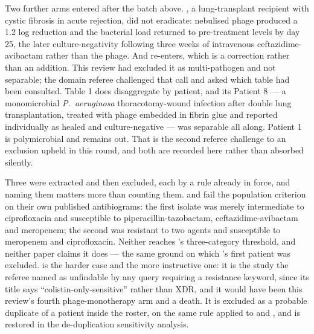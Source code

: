 Two further arms entered after the batch above. \textcite{PardoFreire2025_asmcr}, a lung-transplant recipient with cystic fibrosis in acute rejection, did not eradicate: nebulised phage produced a 1.2 log reduction and the bacterial load returned to pre-treatment levels by day 25, the later culture-negativity following three weeks of intravenous ceftazidime-avibactam rather than the phage. And \textcite{Rubalskii2020_antibiotics} re-enters, which is a correction rather than an addition. This review had excluded it as multi-pathogen and not separable; the domain referee challenged that call and asked which table had been consulted. Table 1 does disaggregate by patient, and its Patient 8 --- a monomicrobial \textit{P.\ aeruginosa} thoracotomy-wound infection after double lung transplantation, treated with phage embedded in fibrin glue and reported individually as healed and culture-negative --- was separable all along. Patient 1 is polymicrobial and remains out. That is the second referee challenge to an exclusion upheld in this round, and both are recorded here rather than absorbed silently.

Three were extracted and then excluded, each by a rule already in force, and naming them matters more than counting them. \textcite{Chung2026_natcommun} and \textcite{Ronit2024_ugeskr} fail the population criterion on their own published antibiograms: the first isolate was merely intermediate to ciprofloxacin and susceptible to piperacillin-tazobactam, ceftazidime-avibactam and meropenem; the second was resistant to two agents and susceptible to meropenem and ciprofloxacin. Neither reaches \textcite{Magiorakos2012_mdrxdr}'s three-category threshold, and neither paper claims it does --- the same ground on which \citeauthor{Liu2025_mlife_perinephric}'s first patient was excluded. \textcite{Jennes2017_critcare} is the harder case and the more instructive one: it is the study the referee named as unfindable by any query requiring a resistance keyword, since its title says ``colistin-only-sensitive'' rather than XDR, and it would have been this review's fourth phage-monotherapy arm and a death. It is excluded as a probable duplicate of a patient inside the \citeauthor{Pirnay2024_natmicrobiol} roster, on the same rule applied to \citeauthor{Ferry2022_natcomms} and \citeauthor{Racenis2023_viruses}, and is restored in the de-duplication sensitivity analysis.

